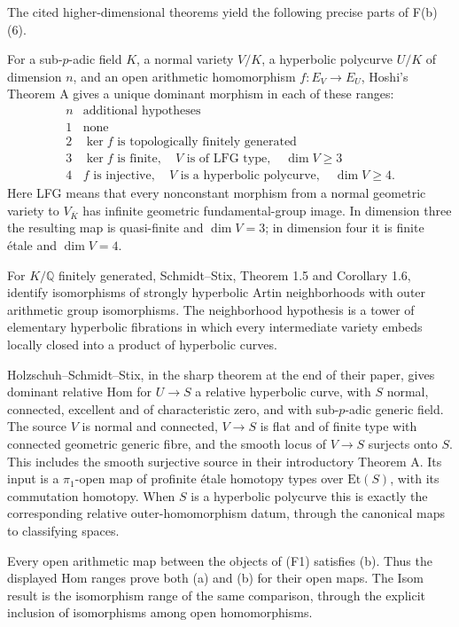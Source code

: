 \begin{proposition}
\label{F-higher-dimensional-ranges}
The cited higher-dimensional theorems yield the following precise
parts of F(b)(6).

For a sub-$p$-adic field $K$, a normal variety $V/K$, a hyperbolic
polycurve $U/K$ of dimension $n$, and an open arithmetic
homomorphism $f:E_V\to E_U$, Hoshi's Theorem A gives a unique
dominant morphism in each of these ranges:
\[
\begin{array}{c|l}
n&\text{additional hypotheses}\\ \hline
1&\text{none}\\
2&\ker f\text{ is topologically finitely generated}\\
3&\ker f\text{ is finite},\quad V\text{ is of LFG type},\quad\dim V\ge3\\
4&f\text{ is injective},\quad V\text{ is a hyperbolic polycurve},
       \quad\dim V\ge4 .
\end{array}
\]
Here LFG means that every nonconstant morphism from a normal
geometric variety to $V_{\overline K}$ has infinite geometric
fundamental-group image. In dimension three the resulting map
is quasi-finite and $\dim V=3$; in dimension four it is finite
\'etale and $\dim V=4$.

For $K/\mathbb Q$ finitely generated, Schmidt--Stix, Theorem 1.5
and Corollary 1.6, identify isomorphisms of strongly hyperbolic
Artin neighborhoods with outer arithmetic group isomorphisms.
The neighborhood hypothesis is a tower of elementary hyperbolic
fibrations in which every intermediate variety embeds locally
closed into a product of hyperbolic curves.

Holzschuh--Schmidt--Stix, in the sharp theorem at the end of
their paper, gives dominant relative Hom for $U\to S$ a
relative hyperbolic curve, with $S$ normal, connected,
excellent and of characteristic zero, and with sub-$p$-adic
generic field. The source $V$ is normal and connected,
$V\to S$ is flat and of finite type with connected geometric
generic fibre, and the smooth locus of $V\to S$ surjects onto
$S$. This includes the smooth surjective source in their
introductory Theorem A. Its input is a
$\pi_1$-open map of profinite \'etale homotopy types over
$\mathrm{Et}(S)$, with its commutation homotopy. When $S$ is a
hyperbolic polycurve this is exactly the corresponding relative
outer-homomorphism datum, through the canonical maps to
classifying spaces.

Every open arithmetic map between the objects of (F1) satisfies
(b). Thus the displayed Hom ranges prove both (a) and (b) for
their open maps. The Isom result is the isomorphism range of the
same comparison, through the explicit inclusion of isomorphisms
among open homomorphisms.
\end{proposition}
